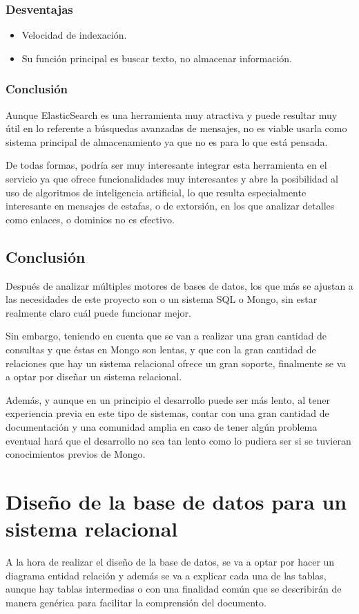 \subsubsection{Desventajas}
\begin{itemize}
    \item Velocidad de indexación.
    \item Su función principal es buscar texto, no almacenar información.
\end{itemize}
\subsubsection{Conclusión}
Aunque ElasticSearch es una herramienta muy atractiva y puede resultar muy útil en lo referente a búsquedas avanzadas de mensajes, no es viable usarla como sistema principal de almacenamiento ya que no es para lo que está pensada. 

De todas formas, podría ser muy interesante integrar esta herramienta en el servicio ya que ofrece funcionalidades muy interesantes y abre la posibilidad al uso de algoritmos de inteligencia artificial, lo que resulta especialmente interesante en mensajes de estafas, o de extorsión, en los que analizar detalles como enlaces, o dominios no es efectivo. 
\subsection{Conclusión}
Después de analizar múltiples motores de bases de datos, los que más se ajustan a las necesidades de este proyecto son o un sistema SQL o Mongo, sin estar realmente claro cuál puede funcionar mejor. 

Sin embargo, teniendo en cuenta que se van a realizar una gran cantidad de consultas y que éstas en Mongo son lentas, y que con la gran cantidad de relaciones que hay un sistema relacional ofrece un gran soporte, finalmente se va a optar por diseñar un sistema relacional.

Además, y aunque en un principio el desarrollo puede ser más lento, al tener experiencia previa en este tipo de sistemas, contar con una gran cantidad de documentación y una comunidad amplia en caso de tener algún problema eventual hará que el desarrollo no sea tan lento como lo pudiera ser si se tuvieran conocimientos previos de Mongo. 


\section{Diseño de la base de datos para un sistema relacional}
A la hora de realizar el diseño de la base de datos, se va a optar por hacer un diagrama entidad relación y además se va a explicar cada una de las tablas, aunque hay tablas intermedias o con una finalidad común que se describirán de manera genérica para facilitar la comprensión del documento. 

